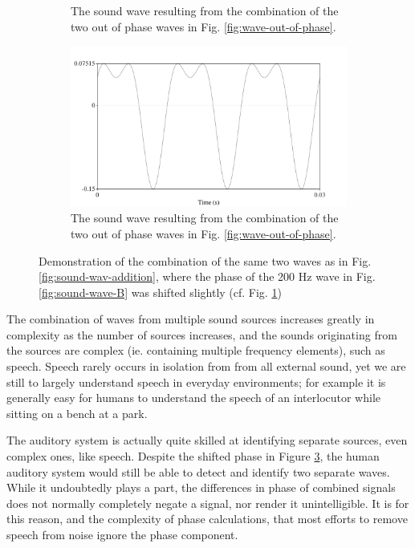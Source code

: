 \documentclass[dissertation,copyright]{uathesis}
\begin{document}
\begin{figure}[h!]
\begin{subfigure}{0.5\textwidth}
  \caption{The sound wave resulting from the combination of the two out of phase waves in Fig. \ref{fig:wave-out-of-phase}.}
  \label{fig:wave-addition-200hz-shifted}
\end{subfigure}
%
\begin{center}
\begin{subfigure}{0.5\textwidth}
  \includegraphics[width=\textwidth]{figure/sound-combined-shifted-phase.png}
  \caption{The sound wave resulting from the combination of the two out of phase waves in Fig. \ref{fig:wave-out-of-phase}.}
  \label{fig:sound-combined-shifted-phase}
\end{subfigure}
\end{center}
\caption{Demonstration of the combination of the same two waves as in Fig. \ref{fig:sound-wav-addition}, where the phase of the 200 Hz wave in Fig. \ref{fig:sound-wave-B} was shifted slightly (cf. Fig. \ref{fig:wave-addition-200hz-shifted})}
\label{fig:sound-shifted-phase}
\end{figure}

The combination of waves from multiple sound sources increases greatly in complexity as the number of sources increases, and the sounds originating from the sources are complex (ie. containing multiple frequency elements), such as speech.  Speech rarely occurs in isolation from from all external sound, yet we are still to largely understand speech in everyday environments; for example it is generally easy for humans to understand the speech of an interlocutor while sitting on a bench at a park.

The auditory system is actually quite skilled at identifying separate sources, even complex ones, like speech. Despite the shifted phase in Figure \ref{fig:sound-shifted-phase}, the human auditory system would still be able to detect and identify two separate waves.  While it undoubtedly plays a part, the differences in phase of combined signals does not normally completely negate a signal, nor render it unintelligible.  It is for this reason, and the complexity of phase calculations, that most efforts to remove speech from noise ignore the phase component.
\end{document}
